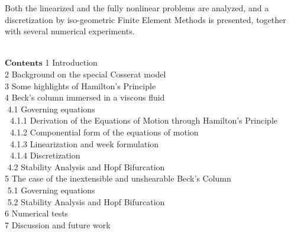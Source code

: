 \documentclass[12pt]{article}
\begin{document}
Both the linearized and the fully nonlinear problems are analyzed, and a discretization by iso-geometric Finite Element Methods is presented, together with several numerical experiments. 
\\\\
\begin{center}
$\mathbf{Contents}$
1 Introduction\\
2 Background on the special Cosserat model\\
3 Some highlights of Hamilton’s Principle\\
4 Beck’s column immersed in a viscous fluid\\
\,\,4.1 Governing equations\\
\,\,\,\,4.1.1 Derivation of the Equations of Motion through Hamilton’s Principle\\
\,\,\,\,4.1.2 Componential form of the equations of motion\\
\,\,\,\,4.1.3 Linearization and week formulation\\
\,\,\,\,4.1.4 Discretization\\
\,\,4.2 Stability Analysis and Hopf Bifurcation\\
5 The case of the inextensible and unshearable Beck’s Column\\
\,\,5.1 Governing equations\\
\,\,5.2 Stability Analysis and Hopf Bifurcation\\
6 Numerical tests\\
7 Discussion and future work\\
\\\\

\end{center}
\end{document}
